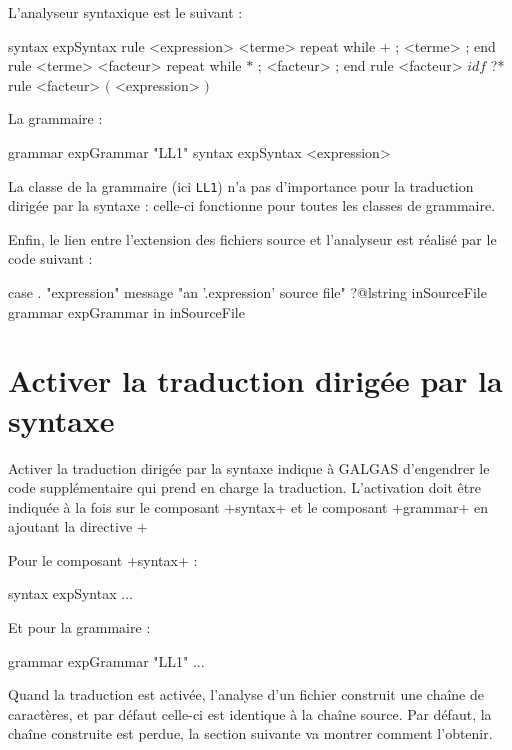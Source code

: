 L'analyseur syntaxique est le suivant :
\begin{galgas}
syntax expSyntax {
  rule <expression> {
    <terme>
    repeat while $+$ ; <terme> ; end
  }
  rule <terme> {
    <facteur>
    repeat while $*$ ; <facteur> ; end
  }
  rule <facteur> {
    $idf$ ?*
  }
  rule <facteur> {
    $($
    <expression>
    $)$
  }
}
\end{galgas}

La grammaire :
\begin{galgas}
grammar expGrammar "LL1" {
  syntax expSyntax
  <expression>
}
\end{galgas}

La classe de la grammaire (ici \texttt{LL1}) n'a pas d'importance pour la traduction dirigée par la syntaxe : celle-ci fonctionne pour toutes les classes de grammaire. 

Enfin, le lien entre l'extension des fichiers source et l'analyseur est réalisé par le code suivant :
\begin{galgas}
case . "expression"
message "an '.expression' source file"
?@lstring inSourceFile {
  grammar expGrammar in inSourceFile
}
\end{galgas}








\section{Activer la traduction dirigée par la syntaxe}

Activer la traduction dirigée par la syntaxe indique à GALGAS d'engendrer le code supplémentaire qui prend en charge la traduction. L'activation doit être indiquée à la fois sur le composant \ggs+syntax+ et le composant \ggs+grammar+ en ajoutant la directive \ggs+%

Pour le composant \ggs+syntax+ :
\begin{galgas}
syntax expSyntax %
  ...
\end{galgas}

Et pour la grammaire :
\begin{galgas}
grammar expGrammar "LL1" %
  ...
\end{galgas}

Quand la traduction est activée, l'analyse d'un fichier construit une chaîne de caractères, et par défaut celle-ci est identique à la chaîne source. Par défaut, la chaîne construite est perdue, la section suivante va montrer comment l'obtenir.








